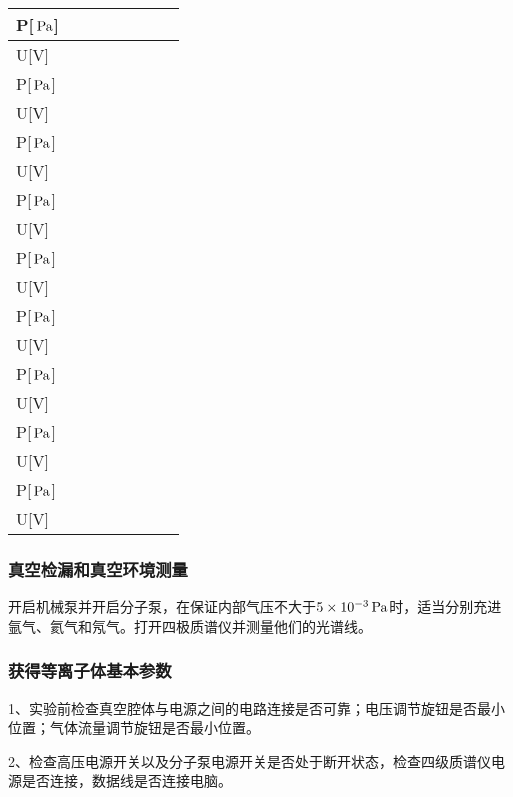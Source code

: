 \documentclass{ctexart}
\begin{document}
\begin{tabular}{|p{4em}|p{4em}|p{4em}|p{4em}|p{4em}|p{4em}|p{4em}|}
  \hline
  P[$\,\mathrm{Pa}$] &\, &\, &\, &\, &\, &\, \\
  \hline
  U[V] &\,&\,&\,&\,&\,&\,\\
  \hline
  P[$\,\mathrm{Pa}$] &\, &\, &\, &\, &\, &\, \\
  \hline
  U[V] &\,&\,&\,&\,&\,&\,\\
  \hline
  P[$\,\mathrm{Pa}$] &\, &\, &\, &\, &\, &\, \\
  \hline
  U[V] &\,&\,&\,&\,&\,&\,\\
  \hline
  P[$\,\mathrm{Pa}$] &\, &\, &\, &\, &\, &\, \\
  \hline
  U[V] &\,&\,&\,&\,&\,&\,\\
  \hline
  P[$\,\mathrm{Pa}$] &\, &\, &\, &\, &\, &\, \\
  \hline
  U[V] &\,&\,&\,&\,&\,&\,\\
  \hline
  P[$\,\mathrm{Pa}$] &\, &\, &\, &\, &\, &\, \\
  \hline
  U[V] &\,&\,&\,&\,&\,&\,\\
  \hline
  P[$\,\mathrm{Pa}$] &\, &\, &\, &\, &\, &\, \\
  \hline
  U[V] &\,&\,&\,&\,&\,&\,\\
  \hline
  P[$\,\mathrm{Pa}$] &\, &\, &\, &\, &\, &\, \\
  \hline
  U[V] &\,&\,&\,&\,&\,&\,\\
  \hline
  P[$\,\mathrm{Pa}$] &\, &\, &\, &\, &\, &\, \\
  \hline
  U[V] &\,&\,&\,&\,&\,&\,\\
  \hline
  
\end{tabular}

\subsubsection{真空检漏和真空环境测量}
\par 开启机械泵并开启分子泵，在保证内部气压不大于$5\times 10^{-3}\,\mathrm{Pa}$时，适当分别充进氩气、氦气和氖气。打开四极质谱仪并测量他们的光谱线。

\subsubsection{获得等离子体基本参数}
1、实验前检查真空腔体与电源之间的电路连接是否可靠；电压调节旋钮是否最小位置；气体流量调节旋钮是否最小位置。

2、检查高压电源开关以及分子泵电源开关是否处于断开状态，检查四级质谱仪电源是否连接，数据线是否连接电脑。
\end{document}
